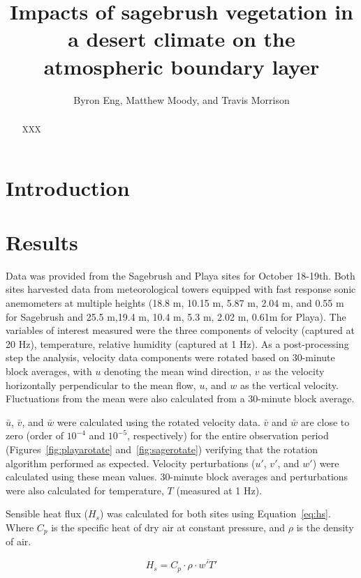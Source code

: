 \documentclass[]{article}
\title{Impacts of sagebrush vegetation in a desert climate on the atmospheric boundary layer}
\author{Byron Eng, Matthew Moody, and Travis Morrison}
\begin{document}
\maketitle

\begin{abstract}
XXX
\end{abstract}

\section{Introduction}

\section{Results}
Data was provided from the Sagebrush and Playa sites for October 18-19th. Both sites harvested data from meteorological towers equipped with fast response sonic anemometers at multiple heights (18.8 m, 10.15 m, 5.87 m, 2.04 m, and 0.55 m for Sagebrush and 25.5 m,19.4 m, 10.4 m, 5.3 m, 2.02 m, 0.61m for Playa). The variables of interest measured were the three components of velocity (captured at 20 Hz), temperature, relative humidity (captured at 1 Hz). As a post-processing step the analysis,  velocity data components were rotated based on 30-minute block averages, with $u$ denoting the mean wind direction, $v$ as the velocity horizontally perpendicular to the mean flow, $u$, and $w$ as the vertical velocity. Fluctuations from the mean were also calculated from a 30-minute block average. 

$\bar{u}$, $\bar{v}$, and $\bar{w}$ were calculated using the rotated velocity data. $\bar{v}$ and $\bar{w}$ are close to zero (order of $10^{-4}$ and $10^{-5}$, respectively) for the entire observation period (Figures~\ref{fig:playarotate} and~\ref{fig:sagerotate}) verifying that the rotation algorithm performed as expected. Velocity perturbations ($u'$, $v'$, and $w'$) were calculated using these mean values. 30-minute block averages and perturbations were also calculated for temperature, $T$ (measured at 1 Hz).

Sensible heat flux ($H_s$) was calculated for both sites using Equation~\ref{eq:hs}. Where $C_p$ is the specific heat of dry air at constant pressure, and $\rho$ is the density of air.

\begin{equation}
H_s = C_p \cdot \rho \cdot \overline{w'T'}
\label{eq:hs}
\end{equation}
\end{document}
